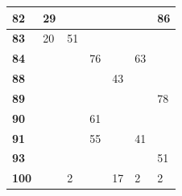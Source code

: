 \begin{appendices}
\begin{landscape}
\begin{table}[!ht]
\begin{tabular}{|l|l|l|l|l|l|l|}
\textbf{82}     & 29                     &                        &                         &                         &                         & 86                     \\ \hline
\textbf{83}     & 20                     & 51                     &                         &                         &                         &                        \\ \hline
\textbf{84}     &                        &                        & 76                      &                         & 63                      &                        \\ \hline
\textbf{88}     &                        &                        &                         & 43                      &                         &                        \\ \hline
\textbf{89}     &                        &                        &                         &                         &                         & 78                     \\ \hline
\textbf{90}     &                        &                        & 61                      &                         &                         &                        \\ \hline
\textbf{91}     &                        &                        & 55                      &                         & 41                      &                        \\ \hline
\textbf{93}     &                        &                        &                         &                         &                         & 51                     \\ \hline
\textbf{100}    &                        & 2                      &                         & 17                      & 2                       & 2                      \\ \hline
\end{tabular}
\end{table}
\end{landscape}



\end{appendices}
